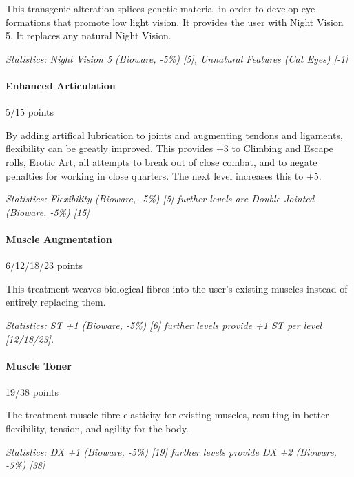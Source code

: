 \begin{multicols*}{3}
	This transgenic alteration splices genetic material in order to develop eye formations that promote low light vision. It provides the user with Night Vision 5. It replaces any natural Night Vision.
	
	\textit{\textcolor{OliveGreen}{Statistics: Night Vision 5 (Bioware, -5\%) [5], Unnatural Features (Cat Eyes) [-1]}}
	
	\paragraph{Enhanced Articulation}
	\begin{flushright}
		5/15 points
	\end{flushright}
	
	By adding artifical lubrication to joints and augmenting tendons and ligaments, flexibility can be greatly improved. This provides +3 to Climbing and Escape rolls, Erotic Art, all attempts to break out of close combat, and to negate penalties for working in close quarters. The next level increases this to +5.
	
	\textit{\textcolor{OliveGreen}{Statistics: Flexibility (Bioware, -5\%) [5] further levels are Double-Jointed (Bioware, -5\%) [15]}}
	
	\paragraph{Muscle Augmentation}
	\begin{flushright}
		6/12/18/23 points
	\end{flushright}
	
	This treatment weaves biological fibres into the user's existing muscles instead of entirely replacing them.
	
	\textit{\textcolor{OliveGreen}{Statistics: ST +1 (Bioware, -5\%) [6] further levels provide +1 ST per level [12/18/23].}}
	
	\paragraph{Muscle Toner}
	\begin{flushright}
		19/38 points
	\end{flushright}
	
	The treatment muscle fibre elasticity for existing muscles, resulting in better flexibility, tension, and agility for the body.
	
	\textit{\textcolor{OliveGreen}{Statistics: DX +1 (Bioware, -5\%) [19] further levels provide DX +2 (Bioware, -5\%) [38]}}
	

\end{multicols*}

